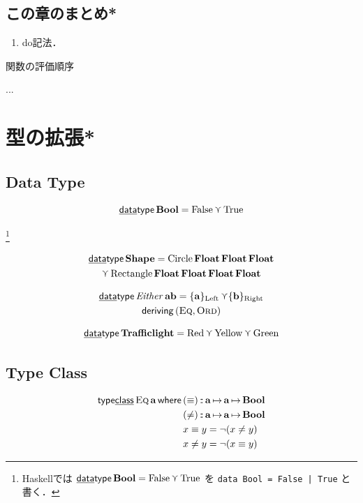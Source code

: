 \documentclass[a4paper,twocolumn]{jsbook}
\newcommand{\programminglanguage}[1]{\textsf{#1}}
\newcommand{\haskell}{\programminglanguage{Haskell}}
\newenvironment{note}[1]{\begin{boxnote}\begin{center}#1\end{center}}{\end{boxnote}}
\newcommand{\code}[1]{\texttt{#1}}
\newcommand{\mKeyword}[1]{\mathsf{#1}} %
\newcommand{\mKeywordUnderline}[1]{\text{\underline{\textsf{#1}}}} %
\newcommand{\mDataTypeKeyword}{\mKeywordUnderline{data}\mKeyword{type}}
\newcommand{\mDerivingKeyword}{\mKeyword{deriving}}
\newcommand{\mTypeClass}{\mKeyword{type}\mKeywordUnderline{class}}
\newcommand{\mWhereKeyword}{\mKeyword{where}}
\DeclareMathOperator{\mDataType}{\mDataTypeKeyword}
\DeclareMathOperator{\mDeriving}{\mDerivingKeyword}
\DeclareMathOperator{\mWhere}{\mWhereKeyword}
\newcommand{\mConst}[1]{\mathrm{#1}}
\newcommand{\mSpecialConst}[1]{\mathrm{#1}} %
\newcommand{\mFalse}{\mSpecialConst{False}}
\newcommand{\mTrue}{\mSpecialConst{True}}
\DeclareMathOperator{\mConst}{const}
\DeclareMathOperator{\mIn}{{:\!:}}
\DeclareMathOperator{\mLetEq}{\triangleq}
\DeclareMathOperator{\mMapsTo}{\mapsto}
\DeclareMathOperator{\mValueOr}{\curlyvee}
\newcommand{\mSpecialSub}[1]{\text{#1}}
\newcommand{\mLeft}{\mSpecialSub{Left}}
\newcommand{\mRight}{\mSpecialSub{Right}}
\newcommand{\mType}[1]{\mathbf{#1}}
\newcommand{\mEitherLeftWith}[1]{\{#1\}_\mLeft}
\newcommand{\mEitherRightWith}[1]{\{#1\}_\mRight}
\newcommand{\mBoolType}{\mType{Bool}}
\newcommand{\mFloatType}{\mType{Float}}
\newcommand{\mTypeConstructor}[1]{\mathit{#1}} %
\DeclareMathOperator{\mEitherTypeConstructor}{\mTypeConstructor{Either}}
\newcommand{\mValueConstructor}[1]{\mathop{\mathrm{#1}}}
\newcommand{\mSpecialTypeClass}[1]{\textsc{#1}} %
\newcommand{\mEqTypeClass}{\mSpecialTypeClass{Eq}}
\newcommand{\mOrdTypeClass}{\mSpecialTypeClass{Ord}}
\newcommand{\mProj}[2]{#1\mMapsTo#2}
\newcommand{\mWhere}[2]{\mathbin{\mWhereKeyword}#1\mLetEq#2}
\begin{document}
\section{この章のまとめ*}

\begin{enumerate}
\item do記法．
\end{enumerate}

\begin{note}{関数の評価順序}
...
\end{note}


\chapter{型の拡張*}

\section{Data Type}

$$
\mDataType\mBoolType=\mFalse\mValueOr\mTrue
$$

{}\footnote{\haskell では $\mDataType\mBoolType=\mFalse\mValueOr\mTrue$ を \code{data Bool = False | True} と書く．}

\begin{multline}
\mDataType\mType{Shape}
=\mValueConstructor{Circle}\mFloatType\,\mFloatType\,\mFloatType\\
\mValueOr
\mValueConstructor{Rectangle}\mFloatType\,\mFloatType\,\mFloatType\,\mFloatType
\end{multline}

\begin{multline}
\mDataType\mEitherTypeConstructor\mType{a}\mType{b}
=\mEitherLeftWith{\mType{a}}
\mValueOr
\mEitherRightWith{\mType{b}}\\
\mDeriving{}(\mEqTypeClass,\mOrdTypeClass)
\end{multline}

$$
\mDataType\mType{Trafficlight}=\mConst{Red}\mValueOr\mConst{Yellow}\mValueOr\mConst{Green}
$$

\section{Type Class}

\begin{align}
\mTypeClass\mathop{\mEqTypeClass}\mType{a}\mWhere{}
&(\equiv)\mIn\mProj{\mType{a}}{\mProj{\mType{a}}{\mBoolType}}\\
&(\neq)\mIn\mProj{\mType{a}}{\mProj{\mType{a}}{\mBoolType}}\\
&x\equiv y=\neg(x\neq y)\\
&x\neq y=\neg(x\equiv y)
\end{align}
\end{document}
